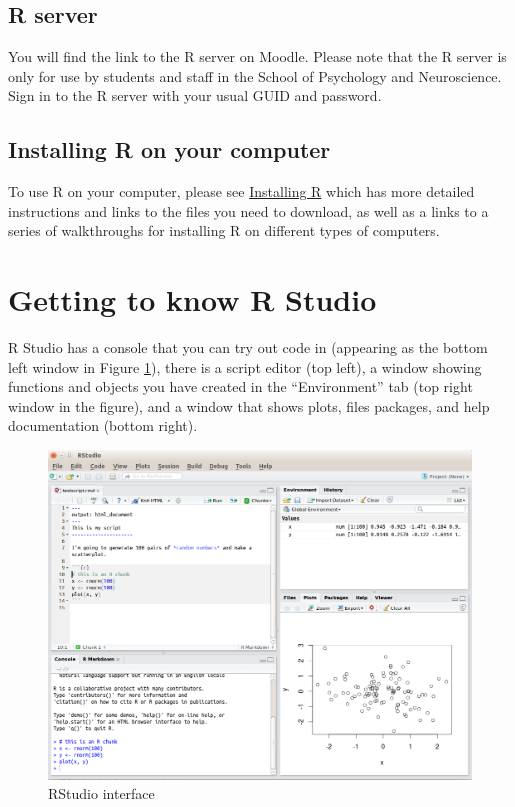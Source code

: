 \documentclass[
  oneside]{book}
\begin{document}
\hypertarget{r-server}{%
\subsection{R server}\label{r-server}}

You will find the link to the R server on Moodle. Please note that the R server is only for use by students and staff in the School of Psychology and Neuroscience. Sign in to the R server with your usual GUID and password.

\hypertarget{installing-r-on-your-computer}{%
\subsection{Installing R on your computer}\label{installing-r-on-your-computer}}

To use R on your computer, please see \href{https://psyteachr.github.io/ug1-practical/installing-r.html}{Installing R} which has more detailed instructions and links to the files you need to download, as well as a links to a series of walkthroughs for installing R on different types of computers.

\hypertarget{getting-to-know-r-studio}{%
\section{Getting to know R Studio}\label{getting-to-know-r-studio}}

R Studio has a console that you can try out code in (appearing as the bottom left window in Figure \ref{fig:img-rstudio}), there is a script editor (top left), a window showing functions and objects you have created in the ``Environment'' tab (top right window in the figure), and a window that shows plots, files packages, and help documentation (bottom right).

\begin{figure}

{\centering \includegraphics[width=1\linewidth]{images/rstudio} 

}

\caption{RStudio interface}\label{fig:img-rstudio}
\end{figure}
\end{document}
